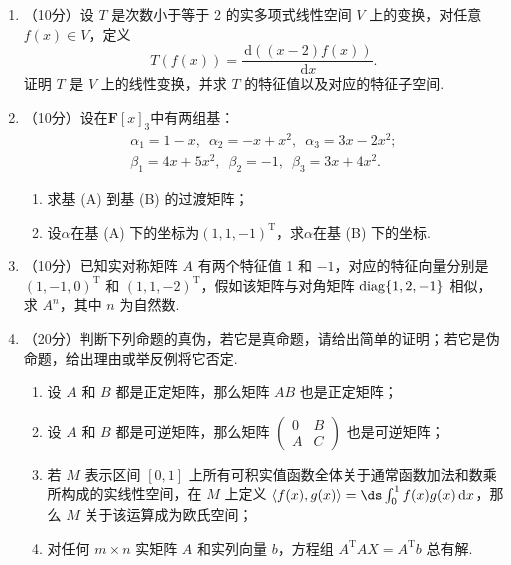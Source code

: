 \begin{enumerate}
	\item （10分）设 $T$ 是次数小于等于 2 的实多项式线性空间 $V$ 上的变换，对任意 $f(x) \in V$，定义
    \[T(f(x))=\frac{\,\mathrm{d}((x-2)f(x))}{\,\mathrm{d}x}.\]
    证明 $T$ 是 $V$ 上的线性变换，并求 $T$ 的特征值以及对应的特征子空间.
	\item （10分）设在$\mathbf{F}[x]_3$中有两组基：
    \begin{gather}
	    \alpha_1=1-x,\enspace\alpha_2=-x+x^2,\enspace\alpha_3=3x-2x^2; \tag{A} \\
        \beta_1=4x+5x^2,\enspace\beta_2=-1,\enspace\beta_3=3x+4x^2. \tag{B}
    \end{gather}
    \begin{enumerate}
        \item 求基 (A) 到基 (B) 的过渡矩阵；

        \item 设$\alpha$在基 (A) 下的坐标为$(1,1,-1)^{\mathrm{T}}$，求$\alpha$在基 (B) 下的坐标.
    \end{enumerate}

\item （10分）已知实对称矩阵 $A$ 有两个特征值 1 和 $-1$，对应的特征向量分别是 $(1,-1,0)^\mathrm{T}$ 和 $(1,1,-2)^\mathrm{T}$，假如该矩阵与对角矩阵 $\operatorname{diag}\{1,2,-1\}$ 相似，求 $A^n$，其中 $n$ 为自然数.
	\item （20分）判断下列命题的真伪，若它是真命题，请给出简单的证明；若它是伪命题，给出理由或举反例将它否定.
    \begin{enumerate}
        \item 设 $A$ 和 $B$ 都是正定矩阵，那么矩阵 $AB$ 也是正定矩阵；

        \item 设 $A$ 和 $B$ 都是可逆矩阵，那么矩阵 $\begin{pmatrix}0 & B \\ A & C\end{pmatrix}$ 也是可逆矩阵；

        \item 若 $M$ 表示区间 $[0,1]$ 上所有可积实值函数全体关于通常函数加法和数乘所构成的实线性空间，在 $M$ 上定义 $\langle f(x), g(x)\rangle=\ds\int_0^1f(x)g(x)\,\mathrm{d}x$，那么 $M$ 关于该运算成为欧氏空间；

        \item 对任何 $m \times n$ 实矩阵 $A$ 和实列向量 $b$，方程组 $A^\mathrm{T}AX=A^\mathrm{T}b$ 总有解.
    \end{enumerate}
\end{enumerate}

\clearpage
